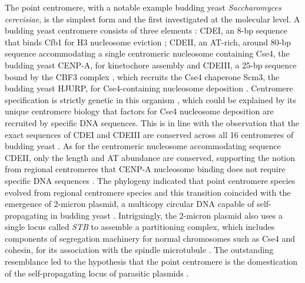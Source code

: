 The point centromere, with a notable example budding yeast \textit{Saccharomyces cerevisiae}, is the simplest form and the first investigated at the molecular level. A budding yeast centromere consists of three elements \citep{Carbon1984StructuralCEN3}: CDEI, an 8-bp sequence that binds Cfb1 for H3 nucleosome eviction \citep{Niedenthal1993Cpf1I, Henikoff2011EpigenomeResolution}; CDEII, an AT-rich, around 80-bp sequence accommodating a single centromeric nucleosome containing Cse4, the budding yeast CENP-A, for kinetochore assembly \citep{Furuyama2007CentromereYeast, Henikoff2014TheVivo, Krassovsky2012TripartiteYeast} and CDEIII, a 25-bp sequence bound by the CBF3 complex \citep{Yan2018ArchitectureKinetochore}, which recruits the Cse4 chaperone Scm3, the budding yeast HJURP, for Cse4-containing nucleosome deposition \citep{Stoler2007Scm3Localization, Camahort2007Scm3Kinetochore}. Centromere specification is strictly genetic in this organism \citep{Clarke1980IsolationChromosomes, J1986SingleCerevisiae, Kingsbury1991Centromere-dependentVitro}, which could be explained by its unique centromere biology that factors for Cse4 nucleosome deposition are recruited by specific DNA sequences. This is in line with the observation that the exact sequences of CDEI and CDEIII are conserved across all 16 centromeres of budding yeast \citep{Clarke1998Centromeres:Eukaryotes, Baker2005GeneticCerevisiae}. As for the centromeric nucleosome accommodating sequence CDEII, only the length and AT abundance are conserved, supporting the notion from regional centromeres that CENP-A nucleosome binding does not require specific DNA sequences \citep{Bensasson2011EvidenceCentromeres}. The phylogeny indicated that point centromere species evolved from regional centromere species and this transition coincided with the emergence of 2-micron plasmid, a multicopy circular DNA capable of self-propagating in budding yeast \citep{Malik2009MajorComplexity}. Intriguingly, the 2-micron plasmid also uses a single locus called \textit{STB} to assemble a partitioning complex, which includes components of segregation machinery for normal chromosomes such as Cse4 and cohesin, for its association with the spindle microtubule \citep{Rizvi2018TheCerevisiae, Huang2011Evolution, Ghosh2007FaithfulSisters}. The outstanding resemblance led to the hypothesis that the point centromere is the domestication of the self-propagating locus of parasitic plasmids \citep{Malik2009MajorComplexity}. 

